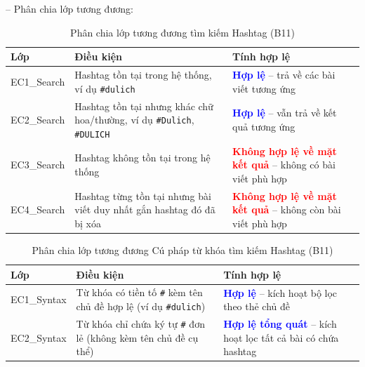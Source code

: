 \documentclass[11pt,a4paper]{article}
\begin{document}
\noindent -- Phân chia lớp tương đương:
\begin{table}[H]
\centering
\small
\begin{tabularx}{\textwidth}{|L{2.6cm}|X|L{4.8cm}|}
\hline
{}
\textbf{Lớp} & \textbf{Điều kiện} & \textbf{Tính hợp lệ} \tabularnewline
\hline
EC1\_Search & Hashtag tồn tại trong hệ thống, ví dụ \texttt{\#dulich} & \textcolor{blue}{\textbf{Hợp lệ}} -- trả về các bài viết tương ứng \\ \hline
EC2\_Search & Hashtag tồn tại nhưng khác chữ hoa/thường, ví dụ \texttt{\#Dulich}, \texttt{\#DULICH} & \textcolor{blue}{\textbf{Hợp lệ}} -- vẫn trả về kết quả tương ứng \\ \hline
EC3\_Search & Hashtag không tồn tại trong hệ thống & \textcolor{red}{\textbf{Không hợp lệ về mặt kết quả}} -- không có bài viết phù hợp \\ \hline
EC4\_Search & Hashtag từng tồn tại nhưng bài viết duy nhất gắn hashtag đó đã bị xóa & \textcolor{red}{\textbf{Không hợp lệ về mặt kết quả}} -- không còn bài viết phù hợp \\ \hline
\end{tabularx}
\caption{Phân chia lớp tương đương tìm kiếm Hashtag (B11)}
\end{table}

\begin{table}[H]
\centering
\small
\begin{tabularx}{\textwidth}{|L{2.6cm}|X|L{4.8cm}|}
\hline
{}
\textbf{Lớp} & \textbf{Điều kiện} & \textbf{Tính hợp lệ} \tabularnewline
\hline
EC1\_Syntax & Từ khóa có tiền tố \texttt{\#} kèm tên chủ đề hợp lệ (ví dụ \texttt{\#dulich}) & \textcolor{blue}{\textbf{Hợp lệ}} -- kích hoạt bộ lọc theo thẻ chủ đề \\ \hline
EC2\_Syntax & Từ khóa chỉ chứa ký tự \texttt{\#} đơn lẻ (không kèm tên chủ đề cụ thể) & \textcolor{blue}{\textbf{Hợp lệ tổng quát}} -- kích hoạt lọc tất cả bài có chứa hashtag \\ \hline
\end{tabularx}
\caption{Phân chia lớp tương đương Cú pháp từ khóa tìm kiếm Hashtag (B11)}
\end{table}
\end{document}
